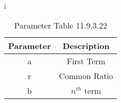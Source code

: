 i
\begin{table}[ht]
  \centering
  \begin{tabular}{|c||c|}
    \hline
    Parameter & Description  \\
    \hline
     a & First Term \\
     \hline
     r & Common Ratio \\
    \hline
    b & $n^{th}$ term\\
    \hline
  \end{tabular}
  \vspace{2mm}
  \caption{Parameter Table 11.9.3.22}
\end{table}
